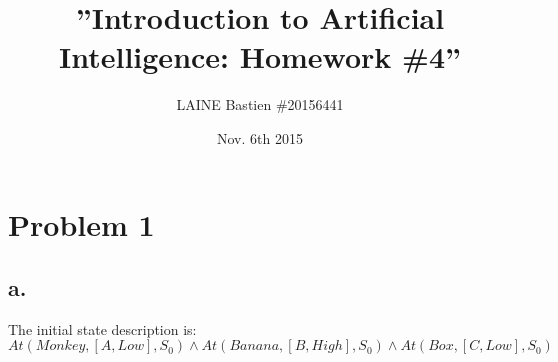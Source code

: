 \documentclass{article}
\begin{document}
\title{\textbf{''Introduction to Artificial Intelligence: Homework \#4''}}
\author{LAINE Bastien \#20156441}
\date{Nov. 6th 2015}
\maketitle
\tableofcontents

\newpage

    \section{Problem 1}
        \subsection{a.}
            The initial state description is:\\
            $At(Monkey,[A,Low],S_0)\land At(Banana,[B,High],S_0)\land At(Box,[C,Low],S_0)$
\end{document}
